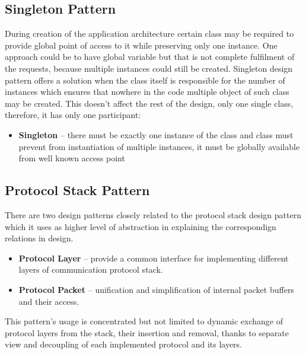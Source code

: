 \subsection{Singleton Pattern}
During creation of the application architecture certain class may be required
to provide global point of access to it while preserving only one instance.
One approach could be to have global variable but that is not complete 
fulfilment of the requests, because multiple instances could still be created. 
Singleton design pattern offers a solution when the class itself is responsible 
for the number of instances which ensures that nowhere in the code multiple 
object of such class may be created. This doesn't affect the rest of the design, 
only one single class, therefore, it has only one participant:

\begin{itemize}
\item \textbf{Singleton} -- there must be exactly one instance of the class and
class must prevent from instantiation of multiple instances,  it must be 
globally available from well known access point
\end{itemize}


\subsection{Protocol Stack Pattern}
There are two design patterns closely related to the protocol stack design 
pattern which it uses as higher level of abstraction in explaining the 
correspondign relations in design.
\begin{itemize}
\item \textbf{Protocol Layer} -- provide a common interface for implementing
different layers of communication protocol stack.
\item \textbf{Protocol Packet} -- unification and simplification of internal
packet buffers and their access.
\end{itemize} 

This pattern's usage is concentrated but not limited to dynamic exchange of 
protocol layers from the stack, their insertion and removal, thanks to separate 
view and decoupling of each implemented protocol and its layers.

